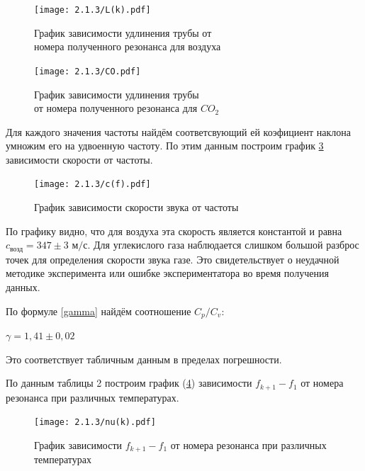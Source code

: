 \documentclass[a4paper,12pt]{article} %
\begin{document}
\begin{figure}[H]
	\begin{center}
		\texttt{[image: 2.1.3/L(k).pdf]}
		\caption{\centering График зависимости удлинения трубы от \\ номера полученного резонанса для воздуха}
		\label{fig:air}
	\end{center}
\end{figure}

\begin{figure}[H]
	\begin{center}
		\texttt{[image: 2.1.3/CO.pdf]}
		\caption{\centering График зависимости удлинения трубы \\ от номера полученного резонанса для $CO_2$}
		\label{fig:CO}
	\end{center}
\end{figure}

Для каждого значения частоты найдём соответсвующий ей коэфициент наклона умножим его на удвоенную частоту. По этим данным построим график \ref{const} зависимости скорости от частоты.

\begin{figure}[H]
	\begin{center}
		\texttt{[image: 2.1.3/c(f).pdf]}
		\caption{График зависимости скорости звука от частоты}
		\label{const}
	\end{center}
\end{figure}

По графику видно, что для воздуха эта скорость является константой и равна $c_{\text{возд}}= 347 \pm 3$ м$/$с. Для углекислого газа наблюдается слишком большой разброс точек для определения скорости звука газе. Это свидетельствует о неудачной методике эксперимента или ошибке экспериментатора во время получения данных.

По формуле \ref{gamma} найдём соотношение $\displaystyle C_p/C_v$:

\begin{center}
    
    $\displaystyle \gamma=1,41 \pm 0,02$
    
\end{center}
Это соответствует табличным данным в пределах погрешности.

По данным таблицы 2 построим график (\ref{nu(k)}) зависимости $f_{k+1} - f_1$ от номера резонанса при различных температурах. 

\begin{figure}[H]
	\begin{center}
		\texttt{[image: 2.1.3/nu(k).pdf]}
		\caption{График зависимости $f_{k+1} - f_1$ от номера резонанса при различных температурах}
		\label{nu(k)}
	\end{center}
\end{figure}
\end{document}
